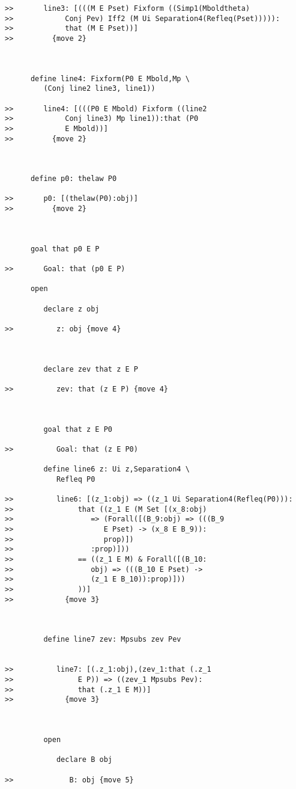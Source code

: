 \documentclass[12pt]{article}
\begin{document}
\begin{verbatim}
>>       line3: [(((M E Pset) Fixform ((Simp1(Mboldtheta)
>>            Conj Pev) Iff2 (M Ui Separation4(Refleq(Pset))))):
>>            that (M E Pset))]
>>         {move 2}



      define line4: Fixform(P0 E Mbold,Mp \
         (Conj line2 line3, line1))

>>       line4: [(((P0 E Mbold) Fixform ((line2
>>            Conj line3) Mp line1)):that (P0
>>            E Mbold))]
>>         {move 2}



      define p0: thelaw P0

>>       p0: [(thelaw(P0):obj)]
>>         {move 2}



      goal that p0 E P

>>       Goal: that (p0 E P)

      open

         declare z obj

>>          z: obj {move 4}



         declare zev that z E P

>>          zev: that (z E P) {move 4}



         goal that z E P0

>>          Goal: that (z E P0)

         define line6 z: Ui z,Separation4 \
            Refleq P0

>>          line6: [(z_1:obj) => ((z_1 Ui Separation4(Refleq(P0))):
>>               that ((z_1 E (M Set [(x_8:obj)
>>                  => (Forall([(B_9:obj) => (((B_9
>>                     E Pset) -> (x_8 E B_9)):
>>                     prop)])
>>                  :prop)]))
>>               == ((z_1 E M) & Forall([(B_10:
>>                  obj) => (((B_10 E Pset) ->
>>                  (z_1 E B_10)):prop)]))
>>               ))]
>>            {move 3}



         define line7 zev: Mpsubs zev Pev


>>          line7: [(.z_1:obj),(zev_1:that (.z_1
>>               E P)) => ((zev_1 Mpsubs Pev):
>>               that (.z_1 E M))]
>>            {move 3}



         open

            declare B obj

>>             B: obj {move 5}




\end{verbatim}
\end{document}
